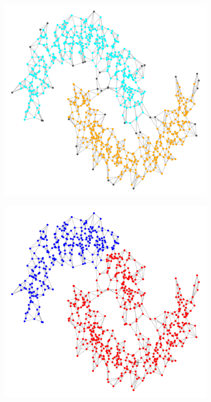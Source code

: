 \documentclass{article}
\newcommand{\1}{\mathbf{1}}
\theoremstyle{aldenthm}
\theoremstyle{aldenrmrk}
\begin{document}
\begin{figure}
\begin{adjustbox}{minipage=\linewidth,scale=0.8}
	\begin{subfigure}{.24\linewidth}
		\includegraphics[width=\linewidth]{example2plots/row2_true_density_cluster}
		\caption{}
	\end{subfigure}
	\begin{subfigure}{.24\linewidth}
		\includegraphics[width=\linewidth]{example2plots/row2_ppr_cluster}

\end{subfigure}
\end{adjustbox}
\end{figure}
\end{document}
